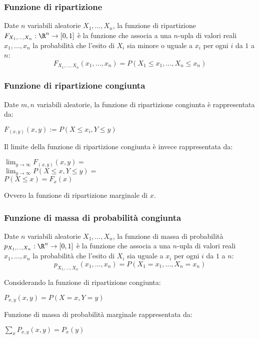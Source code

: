\subsubsection{Funzione di ripartizione}
\begin{defin}
	Date $n$ variabili aleatorie $X_1, \dots, X_n$, la funzione di ripartizione $F_{X_1,\dots,X_n}:\R^n\to[0,1]$ è la funzione che associa a una $n$-upla di valori reali $x_1,\dots,x_n$ la probabilità che l'esito di $X_i$ sia minore o uguale a $x_i$ per ogni $i$ da $1$ a $n$:
	\begin{equation*}
		F_{X_1,\dots,X_n}(x_1,\dots,x_n) = P(X_1\leq x_1,\dots,X_n\leq x_n)
	\end{equation*}
\end{defin}

\subsubsection{Funzione di ripartizione congiunta}
Date $m, n$ variabili aleatorie, la funzione di ripartizione congiunta è rappresentata da:
\begin{center}
$F_{(x,y)} (x,y) := P(X \leq x_i, Y \leq y)$
\end{center}
Il limite della funzione di ripartizione congiunta è invece rappresentata da:
\begin{center}
$\lim_{y\to\infty} F_{(x,y)} (x,y) =$ \\
$\lim_{y\to\infty} P(X \leq x, Y \leq y) = $\\
$P(X \leq x) = F_x(x)$
\end{center}
Ovvero la funzione di ripartizione marginale di $x$.

\subsubsection{Funzione di massa di probabilità congiunta}
\begin{defin}
	Date $n$ variabili aleatorie $X_1, \dots, X_n$, la funzione di massa di probabilità $p_{X_1,\dots,X_n}:\R^n\to[0,1]$ è la funzione che associa a una $n$-upla di valori reali $x_1,\dots,x_n$ la probabilità che l'esito di $X_i$ sia uguale a $x_i$ per ogni $i$ da $1$ a $n$:
	\begin{equation*}
		p_{X_1,\dots,X_n}(x_1,\dots,x_n) = P(X_1=x_1,\dots,X_n=x_n)
	\end{equation*}
\end{defin}

Considerando la funzione di ripartizione congiunta:
\begin{center}
$P_{x,y} (x,y) = P(X = x, Y = y)$
\end{center}
Funzione di massa di probabilità marginale rappresentata da:
\begin{center}
$\sum_{x} P_{x,y} (x,y) = P_x(y)$
\end{center}

